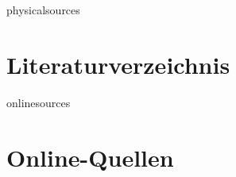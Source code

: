 \documentclass{article}
\begin{document}
\newpage
\listoffigures %
\listoftables %
\lstlistoflistings %

\begin{btSect}{physicalsources} %
\section*{Literaturverzeichnis}
\btPrintCited
\end{btSect}
\begin{btSect}{onlinesources}
\section*{Online-Quellen}
\btPrintCited
\end{btSect}

\end{document}
